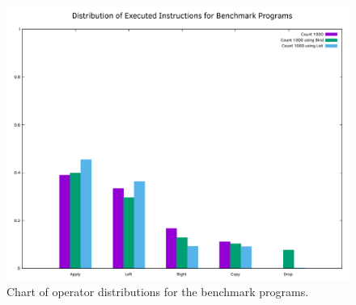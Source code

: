 \begin{figure}[hb]
    \centering
    \includegraphics[width=\textwidth]{04_results/images/program_term_distribution}
    \caption{Chart of operator distributions for the benchmark programs.}
    \label{fig:program_term_distribution}
\end{figure}
